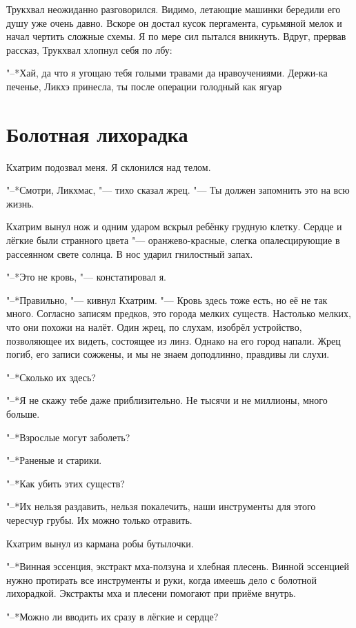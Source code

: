 Трукхвал неожиданно разговорился.
Видимо, летающие машинки бередили его душу уже очень давно.
Вскоре он достал кусок пергамента, сурьмяной мелок и начал чертить сложные схемы.
Я по мере сил пытался вникнуть.
Вдруг, прервав рассказ, Трукхвал хлопнул себя по лбу:

"--*Хай, да что я угощаю тебя голыми травами да нравоучениями.
Держи-ка печенье, Ликхэ принесла, ты после операции голодный как ягуар\ldotst

\section{Болотная лихорадка}

Кхатрим подозвал меня.
Я склонился над телом.

"--*Смотри, Ликхмас, "--- тихо сказал жрец.
"--- Ты должен запомнить это на всю жизнь.

Кхатрим вынул нож и одним ударом вскрыл ребёнку грудную клетку.
Сердце и лёгкие были странного цвета "--- оранжево-красные, слегка опалесцирующие в рассеянном свете солнца.
В нос ударил гнилостный запах.

"--*Это не кровь, "--- констатировал я.

"--*Правильно, "--- кивнул Кхатрим.
"--- Кровь здесь тоже есть, но её не так много.
Согласно записям предков, это города мелких существ.
Настолько мелких, что они похожи на налёт.
Один жрец, по слухам, изобрёл устройство, позволяющее их видеть, состоящее из линз.
Однако на его город напали.
Жрец погиб, его записи сожжены, и мы не знаем доподлинно, правдивы ли слухи.

"--*Сколько их здесь?

"--*Я не скажу тебе даже приблизительно.
Не тысячи и не миллионы, много больше.

"--*Взрослые могут заболеть?

"--*Раненые и старики.

"--*Как убить этих существ?

"--*Их нельзя раздавить, нельзя покалечить, наши инструменты для этого чересчур грубы.
Их можно только отравить.

Кхатрим вынул из кармана робы бутылочки.

"--*Винная эссенция, экстракт мха-ползуна и хлебная плесень.
Винной эссенцией нужно протирать все инструменты и руки, когда имеешь дело с болотной лихорадкой.
Экстракты мха и плесени помогают при приёме внутрь.

"--*Можно ли вводить их сразу в лёгкие и сердце?

